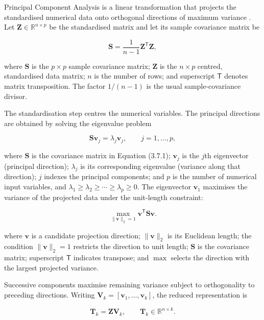 Principal Component Analysis is a linear transformation that projects
the standardised numerical data onto orthogonal directions of maximum
variance \citep{Jolliffe2016}. Let
\(\boldsymbol{Z}\in\mathbb{R}^{n\times p}\) be the standardised matrix
and let its sample covariance matrix be

\[
\boldsymbol{S}=\frac{1}{n-1}\boldsymbol{Z}^{\mathsf T}\boldsymbol{Z},\tag{3.7.1}
\]

\noindent where \(\boldsymbol{S}\) is the \(p\times p\) sample covariance matrix;
\(\boldsymbol{Z}\) is the \(n\times p\) centred, standardised data
matrix; \(n\) is the number of rows; and superscript \(\mathsf{T}\)
denotes matrix transposition. The factor \(1/(n-1)\) is the usual
sample-covariance divisor.

\noindent The standardisation step centres the numerical variables. The principal
directions are obtained by solving the eigenvalue problem

\[
\boldsymbol{S}\boldsymbol{v}_j=\lambda_j\boldsymbol{v}_j,
\qquad j=1,\ldots,p,\tag{3.7.2}
\]

\noindent where \(\boldsymbol{S}\) is the covariance matrix in Equation (3.7.1);
\(\boldsymbol{v}_j\) is the \(j\)th eigenvector (principal direction);
\(\lambda_j\) is its corresponding eigenvalue (variance along that
direction); \(j\) indexes the principal components; and \(p\) is the
number of numerical input variables, and \(\lambda_1\geq\lambda_2\geq\cdots\geq\lambda_p\geq0\). The
eigenvector \(\boldsymbol{v}_1\) maximises the variance of the projected
data under the unit-length constraint:

\[
\max_{\|\boldsymbol{v}\|_2=1}
\boldsymbol{v}^{\mathsf T}\boldsymbol{S}\boldsymbol{v}.\tag{3.7.3}
\]

\noindent where \(\boldsymbol{v}\) is a candidate projection direction;
\(\|\boldsymbol{v}\|_2\) is its Euclidean length; the condition
\(\|\boldsymbol{v}\|_2=1\) restricts the direction to unit length;
\(\boldsymbol{S}\) is the covariance matrix; superscript \(\mathsf{T}\)
indicates transpose; and \(\max\) selects the direction with the largest
projected variance.

\noindent Successive components maximise remaining variance subject to
orthogonality to preceding directions. Writing
\(\boldsymbol{V}_k=[\boldsymbol{v}_1,\dots,\boldsymbol{v}_k]\), the
reduced representation is

\[
\boldsymbol{T}_k=\boldsymbol{Z}\boldsymbol{V}_k,
\qquad \boldsymbol{T}_k\in\mathbb{R}^{n\times k}.\tag{3.7.4}
\]


